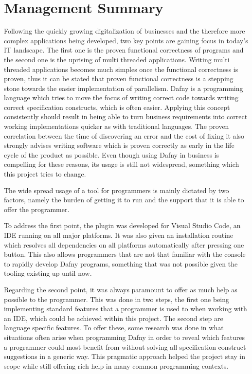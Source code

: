 \section{Management Summary}
Following the quickly growing digitalization of businesses and the therefore more complex applications being developed, two key points are gaining focus in today's IT landscape. The first one is the proven functional correctness of programs and the second one is the uprising of multi threaded applications. Writing multi threaded applications becomes much simples once the functional correctness is proven, thus it can be stated that proven functional correctness is a stepping stone towards the easier implementation of parallelism. Dafny is a programming language which tries to move the focus of writing correct code towards writing correct specification constructs, which is often easier. Applying this concept consistently should result in being able to turn business requirements into correct working implementations quicker as with traditional languages. The proven correlation between the time of discovering an error and the cost of fixing it also strongly advises writing software which is proven correctly as early in the life cycle of the product as possible. Even though using Dafny in business is compelling for these reasons, its usage is still not widespread, something which this project tries to change.\newline

The wide spread usage of a tool for programmers is mainly dictated by two factors, namely the burden of getting it to run and the support that it is able to offer the programmer. \newline

To address the first point, the plugin was developed for Visual Studio Code, an IDE running on all major platforms. It was also given an installation routine which resolves all dependencies on all platforms automatically after pressing one button. This also allows programmers that are not that familiar with the console to rapidly develop Dafny programs, something that was not possible given the tooling existing up until now. \newline

Regarding the second point, it was always paramount to offer as much help as possible to the programmer. This was done in two steps, the first one being implementing standard features that a programmer is used to when working with an IDE, which could be achieved within this project. The second step are language specific features. To offer these, some research was done in what situations often arise when programming Dafny in order to reveal which features a programmer could most benefit from without solving all specification construct suggestions in a generic way. This pragmatic approach helped the project stay in scope while still offering rich help in many common programming contexts. \newline

